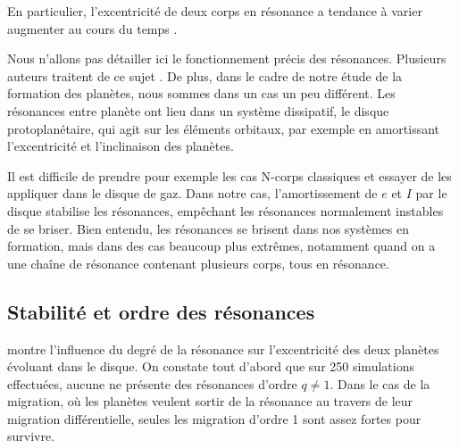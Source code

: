 En particulier, l'excentricité de deux corps en résonance a tendance à varier augmenter au cours du temps \citep[eq.
(8.29)]{murray2000solar}. 

Nous n'allons pas détailler ici le fonctionnement précis des résonances. Plusieurs auteurs traitent de ce sujet
\citep{greenberg1977orbit, peale1986orbital, malhotra1988phd}. De plus, dans le cadre de notre étude de la formation des
planètes, nous sommes dans un cas un
peu différent. Les résonances entre planète ont lieu dans un système dissipatif, le disque protoplanétaire, qui agit sur les
éléments orbitaux, par exemple en amortissant l'excentricité et l'inclinaison des planètes.

Il est difficile de prendre pour exemple les cas N-corps classiques et essayer de les appliquer dans le disque de gaz. Dans
notre cas, l'amortissement de $e$ et $I$ par le disque stabilise les résonances, empêchant les résonances normalement instables
de se briser. Bien entendu, les résonances se brisent dans nos systèmes en formation, mais dans des cas beaucoup plus extrêmes,
notamment quand on a une chaîne de résonance contenant plusieurs corps, tous en résonance. 

\subsection{Stabilité et ordre des résonances}
 montre l'influence du degré de la résonance sur l'excentricité des deux planètes évoluant dans le
disque. On
constate tout d'abord que sur 250 simulations effectuées, aucune ne présente des résonances d'ordre $q\neq 1$. Dans le cas de la
migration, où les planètes veulent sortir de la résonance au travers de leur migration différentielle, seules les migration
d'ordre 1 sont assez fortes pour survivre. 


